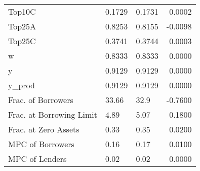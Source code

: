 \begin{table}
\begin{tabular}{lllr}
                  Top10C &  0.1729 &   0.1731 &   0.0002 \\
                  Top25A &  0.8253 &   0.8155 &  -0.0098 \\
                  Top25C &  0.3741 &   0.3744 &   0.0003 \\
                       w &  0.8333 &   0.8333 &   0.0000 \\
                       y &  0.9129 &   0.9129 &   0.0000 \\
                  y\_prod &  0.9129 &   0.9129 &   0.0000 \\
      Frac. of Borrowers &   33.66 &     32.9 &  -0.7600 \\
Frac. at Borrowing Limit &    4.89 &     5.07 &   0.1800 \\
    Frac. at Zero Assets &    0.33 &     0.35 &   0.0200 \\
        MPC of Borrowers &    0.16 &     0.17 &   0.0100 \\
          MPC of Lenders &    0.02 &     0.02 &   0.0000 \\
\bottomrule
\end{tabular}
\end{table}
